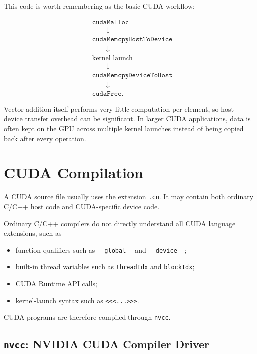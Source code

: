\documentclass[11pt,a4paper]{article}
\begin{document}
This code is worth remembering as the basic CUDA workflow:

\[
\begin{aligned}
&\texttt{cudaMalloc} \\
&\qquad\downarrow \\
&\texttt{cudaMemcpyHostToDevice} \\
&\qquad\downarrow \\
&\text{kernel launch} \\
&\qquad\downarrow \\
&\texttt{cudaMemcpyDeviceToHost} \\
&\qquad\downarrow \\
&\texttt{cudaFree}.
\end{aligned}
\]

Vector addition itself performs very little computation per element, so host--device transfer overhead can be significant. In larger CUDA applications, data is often kept on the GPU across multiple kernel launches instead of being copied back after every operation.

\section{CUDA Compilation}

A CUDA source file usually uses the extension \texttt{.cu}. It may contain both ordinary C/C++ host code and CUDA-specific device code.

Ordinary C/C++ compilers do not directly understand all CUDA language extensions, such as

\begin{itemize}
    \item function qualifiers such as \texttt{\_\_global\_\_} and \texttt{\_\_device\_\_};
    \item built-in thread variables such as \texttt{threadIdx} and \texttt{blockIdx};
    \item CUDA Runtime API calls;
    \item kernel-launch syntax such as \texttt{<<<...>>>}.
\end{itemize}

CUDA programs are therefore compiled through \texttt{nvcc}.

\subsection{\texttt{nvcc}: NVIDIA CUDA Compiler Driver}
\end{document}
